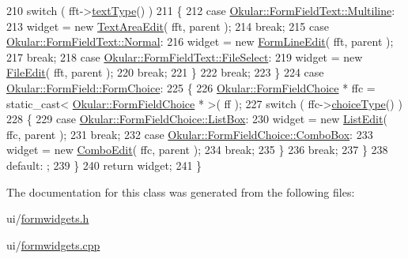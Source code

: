 \begin{DoxyCode}
210             \textcolor{keywordflow}{switch} ( fft->\hyperlink{classOkular_1_1FormFieldText_af23fa9f5620f6b3909a064f8285348fc}{textType}() )
211             \{
212                 \textcolor{keywordflow}{case} \hyperlink{classOkular_1_1FormFieldText_a13b763ea02b44247df564b79996671baa4cd572a2044a634f8df6a284f595dc2f}{Okular::FormFieldText::Multiline}:
213                     widget = \textcolor{keyword}{new} \hyperlink{classTextAreaEdit}{TextAreaEdit}( fft, parent );
214                     \textcolor{keywordflow}{break};
215                 \textcolor{keywordflow}{case} \hyperlink{classOkular_1_1FormFieldText_a13b763ea02b44247df564b79996671baabf3d7517053b7298f8051cea7f0cf034}{Okular::FormFieldText::Normal}:
216                     widget = \textcolor{keyword}{new} \hyperlink{classFormLineEdit}{FormLineEdit}( fft, parent );
217                     \textcolor{keywordflow}{break};
218                 \textcolor{keywordflow}{case} \hyperlink{classOkular_1_1FormFieldText_a13b763ea02b44247df564b79996671baaeaeb6def433745650b1ffd5dacefc7e2}{Okular::FormFieldText::FileSelect}:
219                     widget = \textcolor{keyword}{new} \hyperlink{classFileEdit}{FileEdit}( fft, parent );
220                     \textcolor{keywordflow}{break};
221             \}
222             \textcolor{keywordflow}{break};
223         \}
224         \textcolor{keywordflow}{case} \hyperlink{classOkular_1_1FormField_a46e9c2bd0942dfe55408c8c1aa5363cfa77c671816ffafa08e36800e93fceb51d}{Okular::FormField::FormChoice}:
225         \{
226             \hyperlink{classOkular_1_1FormFieldChoice}{Okular::FormFieldChoice} * ffc = \textcolor{keyword}{static\_cast<} 
      \hyperlink{classOkular_1_1FormFieldChoice}{Okular::FormFieldChoice} * \textcolor{keyword}{>}( ff );
227             \textcolor{keywordflow}{switch} ( ffc->\hyperlink{classOkular_1_1FormFieldChoice_ae6c02629fc4e317d45624676d36659ec}{choiceType}() )
228             \{
229                 \textcolor{keywordflow}{case} \hyperlink{classOkular_1_1FormFieldChoice_a40b3939793e805c34303dff8262a17b3acc508b1d796fa6a7da5043fdbf6c7d2a}{Okular::FormFieldChoice::ListBox}:
230                     widget = \textcolor{keyword}{new} \hyperlink{classListEdit}{ListEdit}( ffc, parent );
231                     \textcolor{keywordflow}{break};
232                 \textcolor{keywordflow}{case} \hyperlink{classOkular_1_1FormFieldChoice_a40b3939793e805c34303dff8262a17b3a0b28a631de109efed14e9183a83a0855}{Okular::FormFieldChoice::ComboBox}:
233                     widget = \textcolor{keyword}{new} \hyperlink{classComboEdit}{ComboEdit}( ffc, parent );
234                     \textcolor{keywordflow}{break};
235             \}
236             \textcolor{keywordflow}{break};
237         \}
238         \textcolor{keywordflow}{default}: ;
239     \}
240     \textcolor{keywordflow}{return} widget;
241 \}
\end{DoxyCode}


The documentation for this class was generated from the following files\+:\begin{DoxyCompactItemize}
\item 
ui/\hyperlink{formwidgets_8h}{formwidgets.\+h}\item 
ui/\hyperlink{formwidgets_8cpp}{formwidgets.\+cpp}\end{DoxyCompactItemize}
